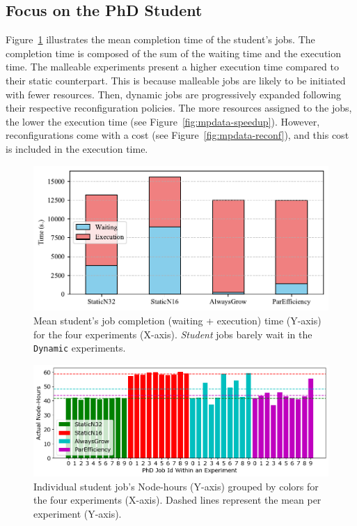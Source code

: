 \documentclass[a4paper,fleqn]{cas-dc}
\begin{document}
\subsection{Focus on the PhD Student}
Figure~\ref{fig:phd_completion} illustrates the mean completion time of the student's jobs.
The completion time is composed of the sum of the waiting time and the execution time. 
The malleable experiments present a higher execution time compared to their static counterpart.
This is because malleable jobs are likely to be initiated with fewer resources.
Then, dynamic jobs are progressively expanded following their respective reconfiguration policies.
The more resources assigned to the jobs, the lower the execution time (see Figure~\ref{fig:mpdata-speedup}). 
However, reconfigurations come with a cost (see Figure~\ref{fig:mpdata-reconf}), and this cost is included in the execution time.

\begin{figure}[tbp]
    \centering
        \includegraphics[clip,width=0.75\linewidth,trim={0.1cm 0.1cm 0.1cm 0.1cm}]{figures/phd-stacked.pdf}
        \caption{Mean student's job completion (waiting + execution) time (Y-axis) for the four experiments (X-axis). \textit{Student} jobs barely wait in the \texttt{Dynamic} experiments.}
        \label{fig:phd_completion}
\end{figure}

\begin{figure}[tbp]
        \includegraphics[clip,width=0.9\linewidth,trim={0.2cm 0.1cm 0.2cm 0.1cm}]{figures/node-hours3.png}
        \caption{Individual student job's Node-hours (Y-axis) grouped by colors for the four experiments (X-axis). Dashed lines represent the mean per experiment (Y-axis).}
        \label{fig:phd_nodehours}
\end{figure}
\end{document}
